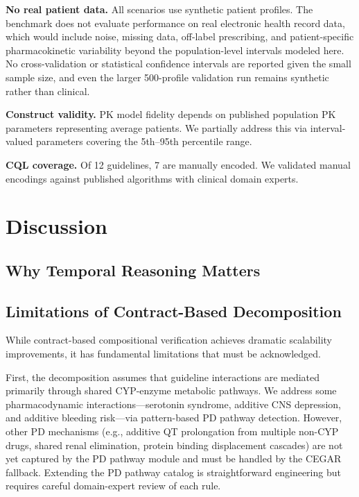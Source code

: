 \documentclass{article}
\theoremstyle{definition}
\begin{document}
\textbf{No real patient data.} All scenarios use synthetic patient profiles. The benchmark does not evaluate performance on real electronic health record data, which would include noise, missing data, off-label prescribing, and patient-specific pharmacokinetic variability beyond the population-level intervals modeled here. No cross-validation or statistical confidence intervals are reported given the small sample size, and even the larger 500-profile validation run remains synthetic rather than clinical.

\textbf{Construct validity.} PK model fidelity depends on published population PK parameters representing average patients. We partially address this via interval-valued parameters covering the 5th--95th percentile range.

\textbf{CQL coverage.} Of 12 guidelines, 7 are manually encoded. We validated manual encodings against published algorithms with clinical domain experts.

\section{Discussion}
\label{sec:discussion}

\subsection{Why Temporal Reasoning Matters}







\subsection{Limitations of Contract-Based Decomposition}

While contract-based compositional verification achieves dramatic scalability improvements, it has fundamental limitations that must be acknowledged.

First, the decomposition assumes that guideline interactions are mediated primarily through shared CYP-enzyme metabolic pathways. We address some pharmacodynamic interactions---serotonin syndrome, additive CNS depression, and additive bleeding risk---via pattern-based PD pathway detection. However, other PD mechanisms (e.g., additive QT prolongation from multiple non-CYP drugs, shared renal elimination, protein binding displacement cascades) are not yet captured by the PD pathway module and must be handled by the CEGAR fallback. Extending the PD pathway catalog is straightforward engineering but requires careful domain-expert review of each rule.
\end{document}
